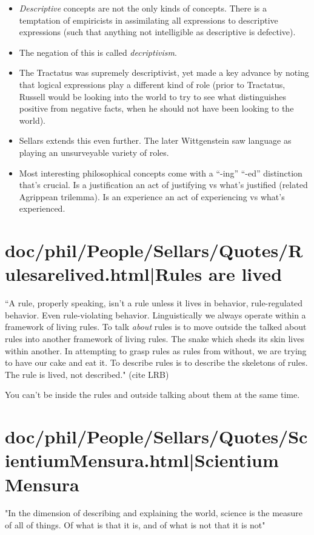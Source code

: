 \documentclass[12pt,a4paper]{report}
\begin{document}
\begin{itemize}
    \item \emph{Descriptive} concepts are not the only kinds of concepts. There
         is a temptation of empiricists in assimilating all expressions to
         descriptive expressions (such that anything not intelligible as
         descriptive is defective).
    \item The negation of this is called \emph{decriptivism}.
    \item The Tractatus was supremely descriptivist, yet made a key advance by
        noting that logical expressions play a different kind of role (prior to
        Tractatus, Russell would be looking into the world to try to see what
        distinguishes positive from negative facts, when he should not have
        been looking to the world).
    \item Sellars extends this even further. The later Wittgenstein saw
        language as playing an unsurveyable variety of roles.
    \item Most interesting philosophical concepts come with a ``-ing'' ``-ed''
        distinction that's crucial. Is a justification an act of justifying vs
        what's justified (related Agrippean trilemma). Is an experience an act
        of experiencing vs what's experienced.
\end{itemize}
\chapter{doc/phil/People/Sellars/Quotes/Rulesarelived.html|Rules are lived}
``A rule, properly speaking, isn't a rule unless it lives in behavior,
rule-regulated behavior. Even rule-violating behavior. Linguistically we always
operate within a framework of living rules. To talk \emph{about} rules is to
move outside the talked about rules into another framework of living rules. The
snake which sheds its skin lives within another. In attempting to grasp rules as
rules from without, we are trying to have our cake and eat it. To describe rules
is to describe the skeletons of rules. The rule is lived, not described."
(cite LRB)

You can't be inside the rules and outside talking about them at the same time.

\chapter{doc/phil/People/Sellars/Quotes/ScientiumMensura.html|Scientium Mensura}
"In the dimension of describing and explaining the world, science is the measure
of all of things. Of what is that it is, and of what is not that it is not"
\end{document}
